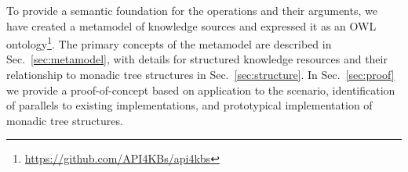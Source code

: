 \documentclass[runningheads]{llncs}
\begin{document}
To provide a semantic foundation for the operations and their arguments, we have created a metamodel of knowledge sources and expressed it as an OWL ontology\footnote{\url{https://github.com/API4KBs/api4kbs}}.
The primary concepts  of the metamodel are described in Sec.~\ref{sec:metamodel}, with details for structured knowledge resources 
and their relationship to monadic tree structures in Sec.~\ref{sec:structure}.
In Sec.~\ref{sec:proof} we provide a proof-of-concept based on application to the scenario, 
identification of parallels to existing implementations, and prototypical implementation of monadic tree structures.


\end{document}
